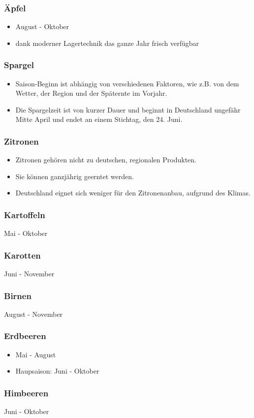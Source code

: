 \documentclass{beamer}
\begin{document}
\begin{frame}
\frametitle{Äpfel}
  \begin{itemize}
    \item
August - Oktober
\item
dank moderner Lagertechnik das ganze Jahr frisch verfügbar
  \end{itemize}
\end{frame}
\begin{frame}
\frametitle{Spargel}
  \begin{itemize}
    \item
Saison-Beginn ist abhängig von verschiedenen Faktoren, wie z.B.
von dem Wetter, der Region und der Späternte im Vorjahr.
\item
Die Spargelzeit ist von kurzer Dauer und beginnt in Deutschland
ungefähr Mitte April und endet an einem Stichtag, den 24.
Juni.
  \end{itemize}
\end{frame}
\begin{frame}
\frametitle{Zitronen}
  \begin{itemize}
    \item
      Zitronen gehören nicht zu deutschen, regionalen
      Produkten.
    \item  Sie können ganzjährig geerntet werden.
    \item  Deutschland eignet sich weniger für den Zitronenanbau,
      aufgrund des Klimas.
  \end{itemize}
\end{frame}
\begin{frame}
\frametitle{Kartoffeln}
Mai - Oktober
\end{frame}
\begin{frame}
\frametitle{Karotten}
Juni - November
\end{frame}
\begin{frame}
\frametitle{Birnen}
August - November
\end{frame}
\begin{frame}
\frametitle{Erdbeeren}
  \begin{itemize}
    \item
Mai - August
\item Haupsaison: Juni - Oktober
  \end{itemize}
\end{frame}

\begin{frame}
\frametitle{Himbeeren}
Juni - Oktober
\end{frame}
\end{document}
